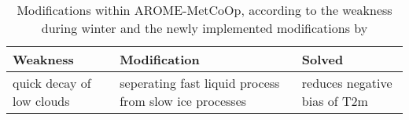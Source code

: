 \begin{table}[h]
	\begin{center}
		\caption{Modifications within AROME-MetCoOp, according to the weakness during winter and the newly implemented modifications by \cite{muller_arome-metcoop:_2017}}\label{tab:AROME_modi}
		\begin{tabular}{l|l|l}
			\hline \hline
            \textbf{Weakness} & \textbf{Modification} & \textbf{Solved} \\ \hline\hline
            quick decay of low clouds & seperating fast liquid process from slow ice processes & \multirow{2}{l}{reduces negative bias of T2m}
			\hline \hline
		\end{tabular}
	\end{center}
\end{table}
